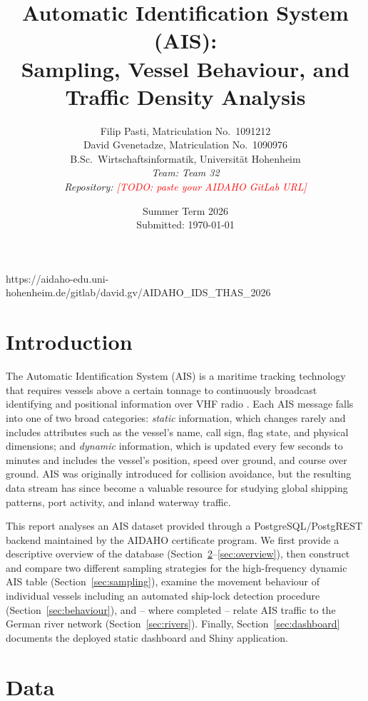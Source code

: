 \documentclass[11pt,a4paper]{article}
\title{\textbf{Automatic Identification System (AIS): \\
Sampling, Vessel Behaviour, and Traffic Density Analysis}}
\author{
  Filip Pasti, Matriculation No.\ 1091212 \\
  David Gvenetadze, Matriculation No.\ 1090976 \\
  B.Sc.\ Wirtschaftsinformatik, Universit\"at Hohenheim \\[4pt]
  \textit{Team: Team 32} \\
  \textit{Repository: \textcolor{red}{[TODO: paste your AIDAHO GitLab URL]}}
}
\date{Summer Term 2026 \\ Submitted: \today}
\begin{document}
\maketitle
\thispagestyle{empty}
\newpage

\setcounter{page}{1}
https://aidaho-edu.uni-hohenheim.de/gitlab/david.gv/AIDAHO_IDS_THAS_2026

\section{Introduction}
\label{sec:intro}

The Automatic Identification System (AIS) is a maritime tracking technology that
requires vessels above a certain tonnage to continuously broadcast identifying
and positional information over VHF radio \autocite{example_ais_intro}. Each AIS
message falls into one of two broad categories: \emph{static} information, which
changes rarely and includes attributes such as the vessel's name, call sign, flag
state, and physical dimensions; and \emph{dynamic} information, which is updated
every few seconds to minutes and includes the vessel's position, speed over
ground, and course over ground. AIS was originally introduced for collision
avoidance, but the resulting data stream has since become a valuable resource for
studying global shipping patterns, port activity, and inland waterway traffic.

This report analyses an AIS dataset provided through a PostgreSQL/PostgREST
backend maintained by the AIDAHO certificate program. We first provide a
descriptive overview of the database (Section~\ref{sec:data}--\ref{sec:overview}),
then construct and compare two different sampling strategies for the
high-frequency dynamic AIS table (Section~\ref{sec:sampling}), examine the
movement behaviour of individual vessels including an automated ship-lock
detection procedure (Section~\ref{sec:behaviour}), and -- where completed --
relate AIS traffic to the German river network (Section~\ref{sec:rivers}).
Finally, Section~\ref{sec:dashboard} documents the deployed static dashboard and
Shiny application.


\section{Data}
\label{sec:data}
\end{document}
